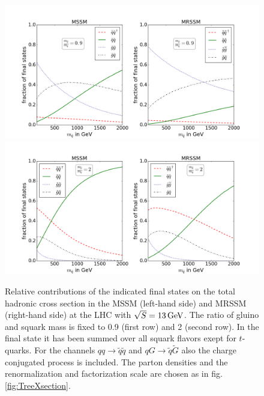 \begin{figure}[!htpb]
\begin{center}
\includegraphics[scale=.45]{figures/rel_weights_mr=0,9_MSSM+MRSSM}
\includegraphics[scale=.45]{figures/rel_weights_mr=2_MSSM+MRSSM}
\caption{Relative contributions of the indicated final states on the total hadronic cross section in the MSSM (left-hand side) and MRSSM (right-hand side) at the LHC with \mbox{$\sqrt{S} = \unit[13]{GeV}$}. The ratio of gluino and squark mass is fixed to 0.9 (first row) and 2 (second row). In the final state it has been summed over all squark flavors exept for $t$-quarks. For the channels $qq \to \tilde{q}\tilde{q}$ and $qG \to \tilde{q}\tilde{G}$ also the charge conjugated process is included. The parton densities and the renormalization and factorization scale are chosen as in fig. \ref{fig:TreeXsection}.}\label{fig:TreeLevelSigma_0,9_2}
\end{center}
\end{figure}

